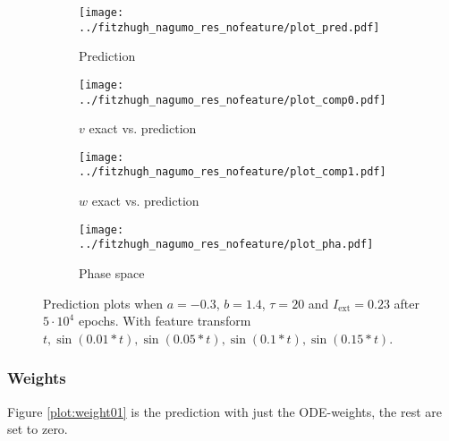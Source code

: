\documentclass[a4paper]{article}
\begin{document}
\begin{figure}[H]
	\centering 
	\begin{subfigure}[b]{0.47\textwidth}
		\centering
		\texttt{[image: ../fitzhugh\_nagumo\_res\_nofeature/plot\_pred.pdf]}
		\caption{Prediction}
		\label{fig:all06a}
	\end{subfigure}
	\begin{subfigure}[b]{0.47\textwidth}
		\centering
		\texttt{[image: ../fitzhugh\_nagumo\_res\_nofeature/plot\_comp0.pdf]}
		\caption{$v$ exact vs. prediction}
		\label{fig:all06b}
	\end{subfigure}
	\begin{subfigure}[b]{0.47\textwidth}
		\centering
		\texttt{[image: ../fitzhugh\_nagumo\_res\_nofeature/plot\_comp1.pdf]}
		\caption{$w$ exact vs. prediction}
		\label{fig:all06c}
	\end{subfigure}
	\begin{subfigure}[b]{0.47\textwidth}
		\centering
		\texttt{[image: ../fitzhugh\_nagumo\_res\_nofeature/plot\_pha.pdf]}
		\caption{Phase space}
		\label{fig:all06d}
	\end{subfigure}
	\caption{Prediction plots when $a=-0.3$, $b=1.4$, $\tau=20$ and $ I_{\text{ext}}=0.23$ after $5\cdot10^4$ epochs. With feature transform $t, \sin(0.01 * t), \sin(0.05 * t), \sin(0.1 * t), \sin(0.15 * t)$.}
	\label{plot:all06}
\end{figure}



\subsubsection{Weights}

Figure \ref{plot:weight01} is the prediction with just the ODE-weights, the rest are set to zero.
\end{document}
